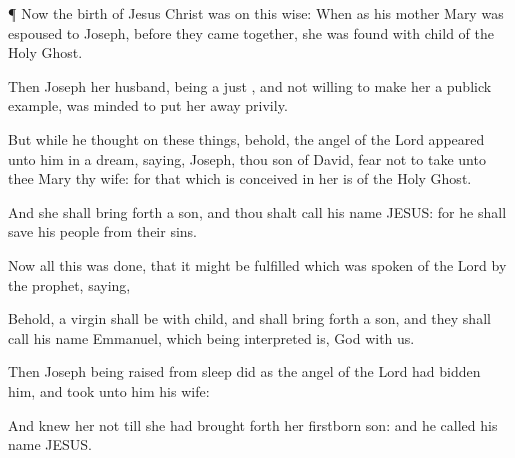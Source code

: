 {\par }{\PP {}¶
Now the
birth of
Jesus
Christ
was on this
wise: When
as
his
mother
Mary was
espoused to
Joseph,
before
they came
together, she was
found
with
child
of
the
Holy
Ghost.

Then
Joseph
her
husband,
being a
just
{},
and
not
willing to
make
her a publick
example, was
minded to
put
her
away
privily.

But
while
he thought
on these
things,
behold, the
angel of the
Lord
appeared unto
him
in a
dream,
saying,
Joseph, thou
son of
David,
fear
not to take unto
thee
Mary
thy
wife: for
that
which is
conceived
in
her
is
of
the
Holy
Ghost.

And she shall bring
forth a
son,
and thou shalt
call
his
name
JESUS:
for
he shall
save
his
people
from
their
sins.

Now
all
this was
done, that
it might be
fulfilled
which was
spoken
of the
Lord
by the
prophet,
saying,

Behold, a
virgin shall
be
with
child,
and shall bring
forth a
son,
and they shall
call
his
name
Emmanuel,
which being
interpreted
is,
God
with
us.

Then
Joseph being
raised
from
sleep
did
as the
angel of the
Lord had
bidden
him,
and took unto
him
his
wife:

And
knew
her
not
till she had brought
forth
her
firstborn
son:
and he
called
his
name
JESUS.




\par }
